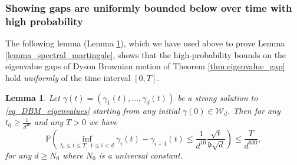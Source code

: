 \documentclass[11pt,letterpaper]{article}
\newtheorem{lemma}[theorem]{Lemma}
\begin{document}
\subsubsection{Showing gaps are uniformly bounded below over time with high probability}
%
%
The following lemma (Lemma \ref{lemma_bad_event}), which we have used above to prove Lemma \ref{lemma_spectral_martingale}, shows that the high-probability bounds on the eigenvalue gaps of Dyson Brownian motion of Theorem \ref{thm:eigenvalue_gap} hold {\em uniformly} of the time interval $[0,T]$.
%

\begin{lemma}\label{lemma_bad_event}
Let $\gamma(t) = (\gamma_1(t), \ldots, \gamma_d(t))$ be a strong solution to \eqref{eq_DBM_eigenvalues} starting from any initial $\gamma(0) \in \mathcal{W}_d$. 
%
Then for any $t_0 \geq \frac{1}{d^{40}}$ and any $T>0$ we have
%
\begin{equation} \label{eq_e1}
    \mathbb{P}\left(\inf_{t_0 \leq t \leq T, \, \, 1\leq i < d  }\gamma_i(t) - \gamma_{i+1}(t) \leq \frac{1}{d^{10}} \frac{\sqrt{t}}{\mathfrak{b}\sqrt{d}}\right) \leq \frac{T}{d^{600}},
\end{equation}
%
for any $d \geq N_0$ where $N_0$ is a universal constant.

\end{lemma}
\end{document}
